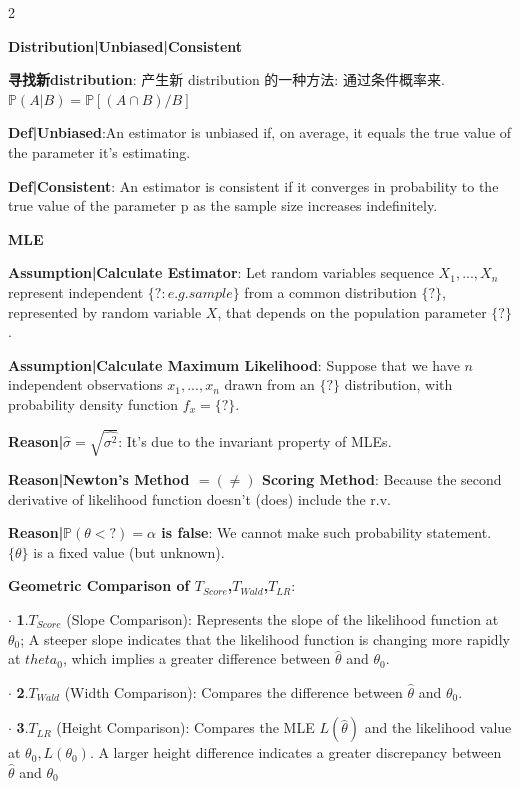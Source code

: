 \documentclass[9pt]{article}
\begin{document}
\vspace{-12pt}
\begin{multicols}{2}

\textbf{Distribution|Unbiased|Consistent}

\textbf{寻找新distribution}: 产生新 distribution 的一种方法: 通过条件概率来. \ \ \ \ \ \ $\mathbb{P}(A|B)=\mathbb{P}[ (A\cap B) / B ]$

\textbf{Def|Unbiased}:An estimator is unbiased if, on average, it equals the true value of the parameter it's estimating.

\textbf{Def|Consistent}: An estimator is consistent if it converges in probability to the true value of the parameter p as the sample size increases indefinitely.


\vspace{5pt}
\textbf{MLE}

\textbf{Assumption|Calculate Estimator}: Let random variables sequence $X_1,...,X_n$ represent independent $\{?:e.g.sample\}$ from a common distribution $\{?\}$, represented by random variable $X$, that depends on the population parameter $\{?\}$.

\textbf{Assumption|Calculate Maximum Likelihood}: Suppose that we have $n$ independent observations $x_1,...,x_n$ drawn from an $\{?\}$ distribution, with probability density function $f_x=\{?\}$.

\textbf{Reason|$\hat{\sigma}=\sqrt{\hat{\sigma^2}}$}: It's due to the invariant property of MLEs.

\textbf{Reason|Newton's Method $=(\ne)$ Scoring Method}: Because the second derivative of likelihood function doesn't (does) include the r.v.

\textbf{Reason|$\mathbb{P}(\theta<?)=\alpha$ is false}: We cannot make such probability statement. $\{\theta\}$ is a fixed value (but unknown).

\textbf{Geometric Comparison of $T_{Score}$,$T_{Wald}$,$T_{LR}$}:

$\cdot$ \textbf{1}.$T_{Score}$ (Slope Comparison): Represents the slope of the likelihood function at $\theta_0$; A steeper slope indicates that the likelihood function is changing more rapidly at $theta_0$, which implies a greater difference between $\widehat{\theta}$ and $\theta_0$.

$\cdot$ \textbf{2}.$T_{Wald}$ (Width Comparison): Compares the difference between $\widehat{\theta}$ and $\theta_0$.

$\cdot$ \textbf{3}.$T_{LR}$ (Height Comparison): Compares the MLE $L(\widehat{\theta})$ and the likelihood value at $\theta_0,L(\theta_0)$. A larger height difference indicates a greater discrepancy between $\widehat{\theta}$ and $\theta_0$


\end{multicols}
\end{document}
